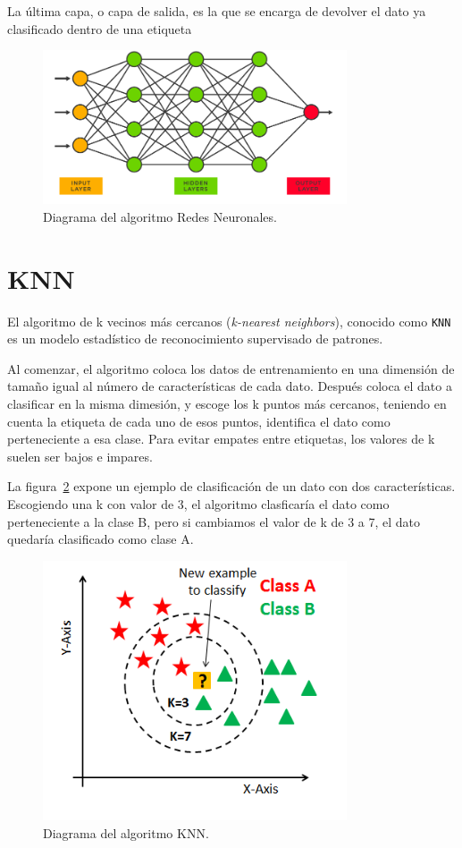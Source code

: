 \documentclass[a4paper, 12pt]{book}
\begin{document}
La última capa, o capa de salida, es la que se encarga de devolver el dato ya clasificado dentro de una etiqueta

\begin{figure}
	\centering
	\includegraphics[width=9cm]{img/neutral-network-diagram.png}
	\caption{Diagrama del algoritmo Redes Neuronales.}\label{fig:neural-networks-diagram}
\end{figure}

\section*{KNN}
\label{sec:knn}

El algoritmo de k vecinos más cercanos (\textit{k-nearest neighbors}), conocido como \texttt{KNN}~\cite{tikariha2018comparative} es un modelo estadístico de reconocimiento supervisado de patrones.

Al comenzar, el algoritmo coloca los datos de entrenamiento en una dimensión de tamaño igual al número de características de cada dato. Después coloca el dato a clasificar en la misma dimesión, y escoge los k puntos más cercanos, teniendo en cuenta la etiqueta de cada uno de esos puntos, identifica el dato como perteneciente a esa clase. Para evitar empates entre etiquetas, los valores de k suelen ser bajos e impares.

La figura~\ref{fig:knn-diagram} expone un ejemplo de clasificación de un dato con dos características. Escogiendo una k con valor de 3, el algoritmo clasficaría el dato como perteneciente a la clase B, pero si cambiamos el valor de k de 3 a 7, el dato quedaría clasificado como clase A.

\begin{figure}
	\centering
	\includegraphics[width=9cm]{img/knn-diagram.png}
	\caption{Diagrama del algoritmo KNN.}\label{fig:knn-diagram}
\end{figure}
\end{document}
